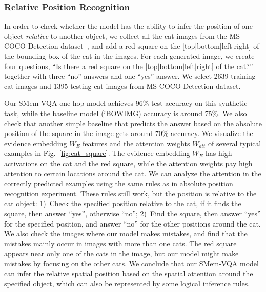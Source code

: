 \vspace{-0.1in}
\subsubsection{Relative Position Recognition}
In order to check whether the model has the ability to infer the  position of one object \textit{relative} to another object,
we collect all the cat images from the MS COCO Detection dataset~\cite{lin2014microsoft}, and add a red square on the [top$\mid$bottom$\mid$left$\mid$right] of the bounding box of the cat in the images.
For each generated image, we create four questions, ``Is there a red square on the [top$\mid$bottom$\mid$left$\mid$right] of the cat?'' together with three ``no'' answers and one ``yes'' answer. 
We select 2639 training cat images and 1395 testing cat images from MS COCO Detection dataset. 

Our SMem-VQA one-hop model achieves 96\% test accuracy on this synthetic task, while the baseline model (iBOWIMG) accuracy is around 75\%.
We also check that another simple baseline that predicts the answer based on the absolute position of the square in the image gets around 70\% accuracy. 
We visualize the evidence embedding $W_E$ features and the attention weights $W_{att}$ of several typical examples in Fig.~\ref{fig:cat_square}.
The evidence embedding $W_E$ has high activations on the cat and the red square, while the attention weights pay high attention to certain locations around the cat.
We can analyze the attention in the correctly predicted examples using the same rules as in absolute position recognition experiment. 
These rules still work, but the position is relative to the cat object:
1)~Check the specified position relative to the cat, if it finds the square, then answer ``yes'', otherwise ``no''; 2)~Find the square, then answer ``yes'' for the specified position, and answer ``no'' for the other positions around the cat.
We also check the images where our model makes mistakes, and find that the mistakes mainly occur in images with more than one cats. The red square appears near only one of the cats in the image, but our model might make mistakes by focusing on the other cats.
We conclude that our SMem-VQA model can infer the relative spatial position based on the spatial attention around the specified object, which can also be represented by some logical inference rules. 



